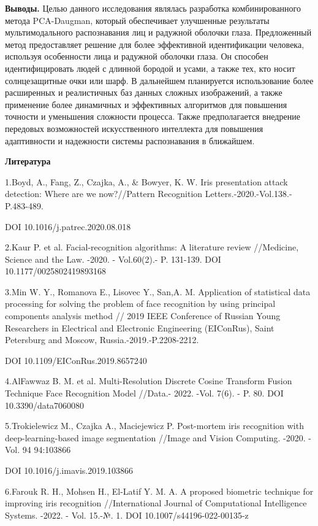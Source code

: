 \textbf{Выводы.} Целью данного исследования являлась разработка
комбинированного метода PCA-Daugman, который обеспечивает улучшенные
результаты мультимодального распознавания лиц и радужной оболочки глаза.
Предложенный метод предоставляет решение для более эффективной
идентификации человека, используя особенности лица и радужной оболочки
глаза. Он способен идентифицировать людей с длинной бородой и усами, а
также тех, кто носит солнцезащитные очки или шарф. В дальнейшем
планируется использование более расширенных и реалистичных баз данных
сложных изображений, а также применение более динамичных и эффективных
алгоритмов для повышения точности и уменьшения сложности процесса. Также
предполагается внедрение передовых возможностей искусственного
интеллекта для повышения адаптивности и надежности системы распознавания
в ближайшем.

\textbf{Литература}

1.Boyd, A., Fang, Z., Czajka, A., \& Bowyer, K. W. Iris presentation
attack detection: Where are we now?//Pattern Recognition
Letters.-2020.-Vol.138.-P.483-489.

DOI 10.1016/j.patrec.2020.08.018

2.Kaur P. et al. Facial-recognition algorithms: A literature review
//Medicine, Science and the Law. -2020. - Vol.60(2).- P. 131-139. DOI
10.1177/0025802419893168

3.Min W. Y., Romanova E., Lisovec Y., San,A. M. Application of
statistical data processing for solving the problem of face recognition
by using principal components analysis method // 2019 IEEE Conference of
Russian Young Researchers in Electrical and Electronic Engineering
(EIConRus), Saint Petersburg and Moscow, Russia.-2019.-P.2208-2212.

DOI 10.1109/EIConRus.2019.8657240

4.AlFawwaz B. M. et al. Multi-Resolution Discrete Cosine Transform
Fusion Technique Face Recognition Model //Data.- 2022. -Vol. 7(6). - P.
80. DOI 10.3390/data7060080

5.Trokielewicz M., Czajka A., Maciejewicz P. Post-mortem iris
recognition with deep-learning-based image segmentation //Image and
Vision Computing. -2020. - Vol. 94 94:103866

DOI 10.1016/j.imavis.2019.103866

6.Farouk R. H., Mohsen H., El-Latif Y. M. A. A proposed biometric
technique for improving iris recognition //International Journal of
Computational Intelligence Systems. -2022. - Vol. 15.-№. 1. DOI
10.1007/s44196-022-00135-z

